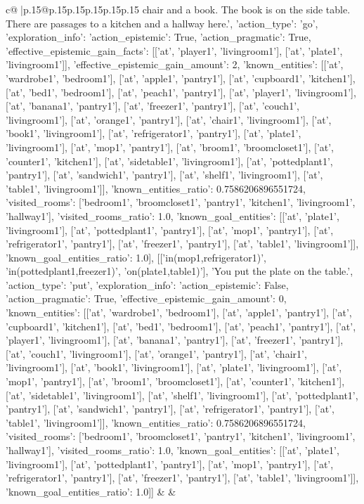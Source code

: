 \documentclass{article}
\begin{document}
{\begin{supertabular}{c@{$\;$}|p{.15\linewidth}@{}p{.15\linewidth}p{.15\linewidth}p{.15\linewidth}p{.15\linewidth}p{.15\linewidth}}
{{{chair and a book. The book is on the side table. There are passages to a kitchen and a hallway here.', {'action_type': 'go', 'exploration_info': {'action_epistemic': True, 'action_pragmatic': True, 'effective_epistemic_gain_facts': [['at', 'player1', 'livingroom1'], ['at', 'plate1', 'livingroom1']], 'effective_epistemic_gain_amount': 2, 'known_entities': [['at', 'wardrobe1', 'bedroom1'], ['at', 'apple1', 'pantry1'], ['at', 'cupboard1', 'kitchen1'], ['at', 'bed1', 'bedroom1'], ['at', 'peach1', 'pantry1'], ['at', 'player1', 'livingroom1'], ['at', 'banana1', 'pantry1'], ['at', 'freezer1', 'pantry1'], ['at', 'couch1', 'livingroom1'], ['at', 'orange1', 'pantry1'], ['at', 'chair1', 'livingroom1'], ['at', 'book1', 'livingroom1'], ['at', 'refrigerator1', 'pantry1'], ['at', 'plate1', 'livingroom1'], ['at', 'mop1', 'pantry1'], ['at', 'broom1', 'broomcloset1'], ['at', 'counter1', 'kitchen1'], ['at', 'sidetable1', 'livingroom1'], ['at', 'pottedplant1', 'pantry1'], ['at', 'sandwich1', 'pantry1'], ['at', 'shelf1', 'livingroom1'], ['at', 'table1', 'livingroom1']], 'known_entities_ratio': 0.7586206896551724, 'visited_rooms': ['bedroom1', 'broomcloset1', 'pantry1', 'kitchen1', 'livingroom1', 'hallway1'], 'visited_rooms_ratio': 1.0, 'known_goal_entities': [['at', 'plate1', 'livingroom1'], ['at', 'pottedplant1', 'pantry1'], ['at', 'mop1', 'pantry1'], ['at', 'refrigerator1', 'pantry1'], ['at', 'freezer1', 'pantry1'], ['at', 'table1', 'livingroom1']], 'known_goal_entities_ratio': 1.0}}], [['in(mop1,refrigerator1)', 'in(pottedplant1,freezer1)', 'on(plate1,table1)'], 'You put the plate on the table.', {'action_type': 'put', 'exploration_info': {'action_epistemic': False, 'action_pragmatic': True, 'effective_epistemic_gain_amount': 0, 'known_entities': [['at', 'wardrobe1', 'bedroom1'], ['at', 'apple1', 'pantry1'], ['at', 'cupboard1', 'kitchen1'], ['at', 'bed1', 'bedroom1'], ['at', 'peach1', 'pantry1'], ['at', 'player1', 'livingroom1'], ['at', 'banana1', 'pantry1'], ['at', 'freezer1', 'pantry1'], ['at', 'couch1', 'livingroom1'], ['at', 'orange1', 'pantry1'], ['at', 'chair1', 'livingroom1'], ['at', 'book1', 'livingroom1'], ['at', 'plate1', 'livingroom1'], ['at', 'mop1', 'pantry1'], ['at', 'broom1', 'broomcloset1'], ['at', 'counter1', 'kitchen1'], ['at', 'sidetable1', 'livingroom1'], ['at', 'shelf1', 'livingroom1'], ['at', 'pottedplant1', 'pantry1'], ['at', 'sandwich1', 'pantry1'], ['at', 'refrigerator1', 'pantry1'], ['at', 'table1', 'livingroom1']], 'known_entities_ratio': 0.7586206896551724, 'visited_rooms': ['bedroom1', 'broomcloset1', 'pantry1', 'kitchen1', 'livingroom1', 'hallway1'], 'visited_rooms_ratio': 1.0, 'known_goal_entities': [['at', 'plate1', 'livingroom1'], ['at', 'pottedplant1', 'pantry1'], ['at', 'mop1', 'pantry1'], ['at', 'refrigerator1', 'pantry1'], ['at', 'freezer1', 'pantry1'], ['at', 'table1', 'livingroom1']], 'known_goal_entities_ratio': 1.0}}]] 
	  } 
	   } 
	   } 
	 & & \\ 
 


\end{supertabular}}
\end{document}
